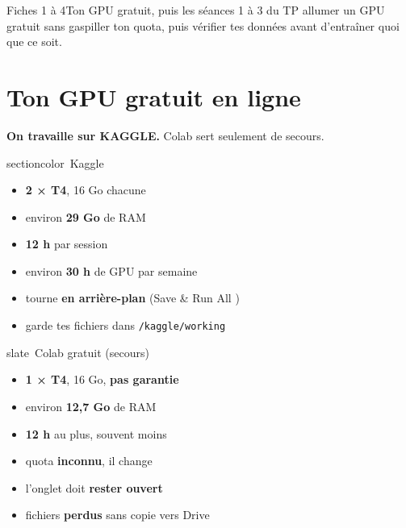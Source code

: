 \documentclass[11pt,a4paper]{article}
\newcommand{\chiffre}[1]{{\Large\bfseries\color{darkblue} #1}}
\begin{document}
  {Fiches 1 à 4}{Ton GPU gratuit, puis les séances 1 à 3 du TP}
  {allumer un GPU gratuit sans gaspiller ton quota, puis vérifier tes données avant d'entraîner quoi que ce soit.}

\vuedensemble

\section{Ton GPU gratuit en ligne}

\begin{tcolorbox}[colback=notebg,colframe=sectioncolor,arc=3pt,halign=center,boxrule=1.5pt]
{\LARGE\faServer\quad\bfseries On travaille sur \textcolor{sectioncolor}{KAGGLE}.}\quad
{\large Colab sert seulement de secours.}
\end{tcolorbox}

\begin{tcbraster}[raster columns=2,raster equal height,raster column skip=8pt]
\begin{card}{sectioncolor}{\faTrophy\ Kaggle}
\begin{itemize}[leftmargin=1.3em,itemsep=3pt]
\item[\faMicrochip] \chiffre{2 × T4}, 16 Go chacune
\item[\faMemory] environ \chiffre{29 Go} de RAM
\item[\faClock] \chiffre{12 h} par session
\item[\faBatteryHalf] environ \chiffre{30 h} de GPU par semaine
\item[\faPlayCircle] tourne \textbf{en arrière-plan} (\og Save \& Run All \fg)
\item[\faSave] garde tes fichiers dans \texttt{/kaggle/working}
\end{itemize}
\end{card}
\begin{card}{slate}{\faLifeRing\ Colab gratuit (secours)}
\begin{itemize}[leftmargin=1.3em,itemsep=3pt]
\item[\faMicrochip] \chiffre{1 × T4}, 16 Go, \textbf{pas garantie}
\item[\faMemory] environ \chiffre{12,7 Go} de RAM
\item[\faClock] \chiffre{12 h} au plus, souvent moins
\item[\faQuestionCircle] quota \textbf{inconnu}, il change
\item[\faEye] l'onglet doit \textbf{rester ouvert}
\item[\faTrash] fichiers \textbf{perdus} sans copie vers Drive
\end{itemize}
\end{card}
\end{tcbraster}
\end{document}
